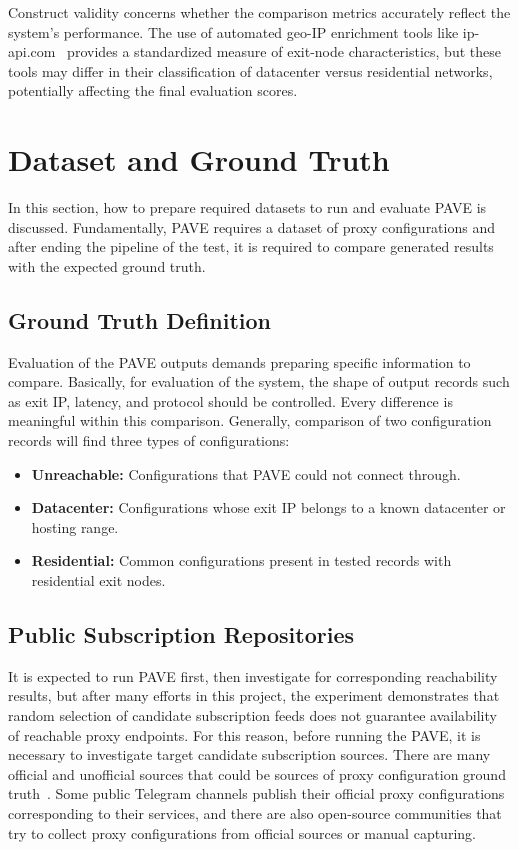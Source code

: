 \documentclass[10pt,conference]{IEEEtran}
\begin{document}
Construct validity concerns whether the comparison metrics accurately reflect the system's performance.
The use of automated geo-IP enrichment tools like ip-api.com~\cite{ipapi} provides a standardized measure of exit-node characteristics, but these tools may differ in their classification of datacenter versus residential networks, potentially affecting the final evaluation scores.

\section{Dataset and Ground Truth}
In this section, how to prepare required datasets to run and evaluate PAVE is discussed.
Fundamentally, PAVE requires a dataset of proxy configurations and after ending the pipeline of the test, it is required to compare generated results with the expected ground truth.

\subsection{Ground Truth Definition}
Evaluation of the PAVE outputs demands preparing specific information to compare.
Basically, for evaluation of the system, the shape of output records such as exit IP, latency, and protocol should be controlled.
Every difference is meaningful within this comparison.
Generally, comparison of two configuration records will find three types of configurations:
\begin{itemize}
    \item \textbf{Unreachable:} Configurations that PAVE could not connect through.
    \item \textbf{Datacenter:} Configurations whose exit IP belongs to a known datacenter or hosting range.
    \item \textbf{Residential:} Common configurations present in tested records with residential exit nodes.
\end{itemize}

\subsection{Public Subscription Repositories}
It is expected to run PAVE first, then investigate for corresponding reachability results, but after many efforts in this project, the experiment demonstrates that random selection of candidate subscription feeds does not guarantee availability of reachable proxy endpoints.
For this reason, before running the PAVE, it is necessary to investigate target candidate subscription sources.
There are many official and unofficial sources that could be sources of proxy configuration ground truth~\cite{perino2019,proxytorrent2018}.
Some public Telegram channels publish their official proxy configurations corresponding to their services, and there are also open-source communities that try to collect proxy configurations from official sources or manual capturing.
\end{document}
